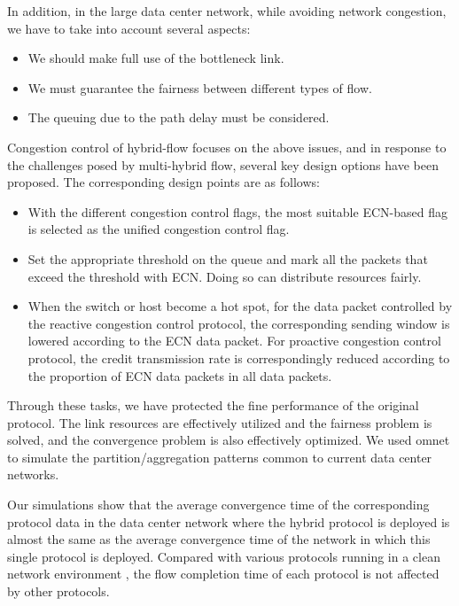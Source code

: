 \documentclass[conference]{IEEEtran}
\begin{document}
\indent In addition, in the large data center network, while avoiding network congestion, we have to take into account several aspects:

\begin{itemize}

\item We should make full use of the bottleneck link.

\item We must guarantee the fairness between different types of flow.

\item The queuing due to the path delay must be considered.

\end{itemize}

\indent Congestion control of hybrid-flow focuses on the above issues, and in response to the challenges posed by multi-hybrid flow, several key design options have been proposed. The corresponding design points are as follows:

\begin{itemize}

\item With the different congestion control flags, the most suitable ECN-based flag is selected as the unified congestion control flag.

\item Set the appropriate threshold on the queue and mark all the packets that exceed the threshold with ECN. Doing so can distribute resources fairly.

\item When the switch or host become a hot spot, for the data packet controlled by the reactive congestion control protocol, the corresponding sending window is lowered according to the ECN data packet. For proactive congestion control protocol, the credit transmission rate is correspondingly reduced according to the proportion of ECN data packets in all data packets.

\end{itemize}

\indent Through these tasks, we have protected the fine performance of the original protocol. The link resources are effectively utilized and the fairness problem is solved, and the convergence problem is also effectively optimized. We used omnet to simulate the partition/aggregation patterns common to current data center networks.

\indent Our simulations show that the average convergence time of the corresponding protocol data in the data center network where the hybrid protocol is deployed is almost the same as the average convergence time of the network in which this single protocol is deployed. Compared with various protocols running in a clean network environment , the flow completion time of each protocol is not affected by other protocols.
\end{document}
